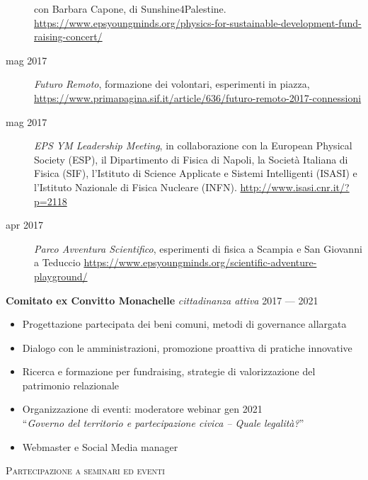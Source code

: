 \documentclass[a4paper]{article}
\newcommand{\lineunder} {
  \vspace*{-8pt} \\
  \hspace*{-18pt} \hrulefill \\
}
\newcommand{\header} [1] {
  {\hspace*{-18pt}\vspace*{6pt} \textsc{#1}}
  \vspace*{-6pt} \lineunder
}
\begin{document}
\begin{addmargin}[1.5em]{0em}
\begin{description}
          con Barbara Capone, di Sunshine4Palestine.
          \url{https://www.epsyoungminds.org/physics-for-sustainable-development-fund-raising-concert/}
    \item [mag 2017] \emph{Futuro Remoto},
          formazione dei volontari, esperimenti in piazza,
          \url{https://www.primapagina.sif.it/article/636/futuro-remoto-2017-connessioni}
    \item[mag 2017] \emph{EPS YM Leadership Meeting},
          in collaborazione con la European Physical Society (ESP),
          il Dipartimento di Fisica di Napoli,
          la Società Italiana di Fisica (SIF),
          l’Istituto di Science Applicate e Sistemi Intelligenti (ISASI)
          e l’Istituto Nazionale di Fisica Nucleare (INFN).
          \url{http://www.isasi.cnr.it/?p=2118}
    \item [apr 2017] \emph{Parco Avventura Scientifico},
          esperimenti di fisica a Scampia e San Giovanni a Teduccio
          \url{https://www.epsyoungminds.org/scientific-adventure-playground/}
  \end{description}
\end{addmargin}

\vspace*{2mm}
\textbf{Comitato ex Convitto Monachelle}
{\sl cittadinanza attiva} \hfill 2017 --- 2021\\
\begin{itemize} \itemsep 1pt
  \item Progettazione partecipata dei beni comuni, metodi di governance
        allargata
  \item Dialogo con le amministrazioni, promozione proattiva di pratiche
        innovative
  \item Ricerca e formazione per fundraising, strategie di valorizzazione del
        patrimonio relazionale
  \item Organizzazione di eventi:
  moderatore webinar gen 2021 \\
        ``\textit{Governo del territorio e partecipazione civica – Quale
        legalità?}''
  \item Webmaster e Social Media manager
\end{itemize}

\header{Partecipazione a seminari ed eventi}
\vspace{1mm}
\end{document}
